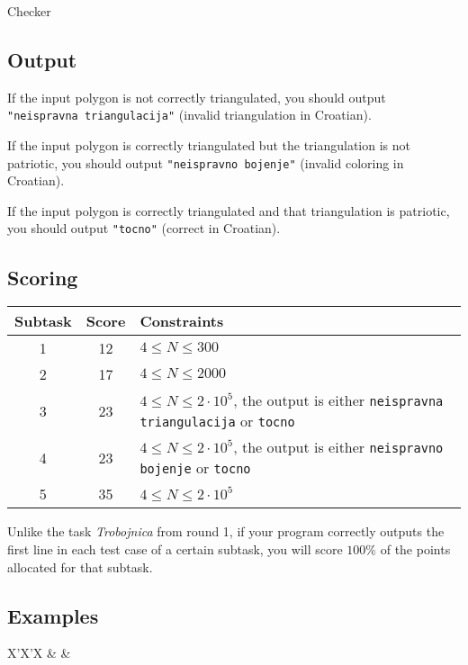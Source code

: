 \begin{statement}[
  problempoints=110,
  timelimit=3 seconds,
  memorylimit=512 MiB,
]{Checker}
\subsection*{Output}
If the input polygon is not correctly triangulated, you should output
\texttt{"neispravna triangulacija"} (invalid triangulation in Croatian).

If the input polygon is correctly triangulated but the triangulation is
not patriotic, you should output \texttt{"neispravno bojenje"} (invalid
coloring in Croatian).

If the input polygon is correctly triangulated and that triangulation is
patriotic, you should output \texttt{"tocno"} (correct in Croatian).

\subsection*{Scoring}
{\renewcommand{\arraystretch}{1.4}
  \setlength{\tabcolsep}{6pt}
  \begin{tabular}{ccl}
 Subtask & Score & Constraints \\ \midrule
  1 & 12 & $4 \le N \le 300$ \\
  2 & 17 & $4 \le N \le 2000$ \\
  3 & 23 & $4 \le N \le 2\cdot10^5$, the output is either \texttt{neispravna triangulacija} or \texttt{tocno} \\
  4 & 23 & $4 \le N \le 2\cdot10^5$, the output is either \texttt{neispravno bojenje} or \texttt{tocno} \\
  5 & 35 & $4 \le N \le 2\cdot10^5$
\end{tabular}}

Unlike the task \textit{Trobojnica} from round 1, if your program correctly
outputs the first line in each test case of a certain subtask, you will score
$100\%$ of the points allocated for that subtask.

\subsection*{Examples}
\begin{tabularx}{\textwidth}{X'X'X}
 &
 &
\end{tabularx}

\end{statement}

